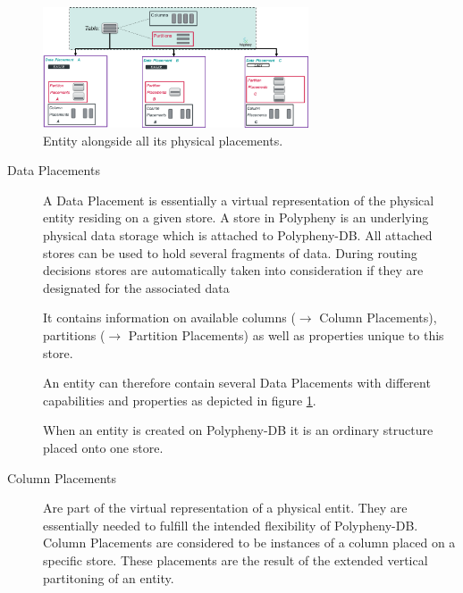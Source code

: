 \begin{figure}[t]
    \centering
    \includegraphics[width=0.7\textwidth]{Figures/entity_placements_replication.png}
    \caption{Entity alongside all its physical placements.}
    \label{fig:placements}
\end{figure}

\begin{description}
    \item [Data Placements] A Data Placement is essentially a virtual representation of the physical entity residing on a given store.
    A store in Polypheny is an underlying physical data storage which is attached to Polypheny-DB.
    All attached stores can be used to hold several fragments of data. 
    During routing decisions stores are automatically taken into consideration if they are designated for the associated data 
    
    It contains information on available columns ($\rightarrow$ Column Placements), partitions ($\rightarrow$ Partition Placements)
    as well as properties unique to this store.
    
    An entity can therefore contain several Data Placements with different capabilities and properties as depicted in figure \ref{fig:placements}. 
    
    When an entity is created on Polypheny-DB it is an ordinary structure placed onto one store. \\

    \item [Column Placements]
    Are part of the virtual representation of a physical entit. They are essentially needed to fulfill the intended flexibility of Polypheny-DB. 
    Column Placements are considered to be instances of a column placed on a specific store.
    These placements are the result of the extended vertical partitoning of an entity.



\end{description}
